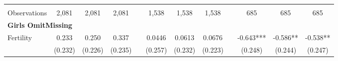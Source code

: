 \begin{landscape}
\begin{table}[htpb!]
\begin{center}
\begin{tabular}{lcccp{2mm}cccp{2mm}ccc}
\begin{footnotesize}\end{footnotesize}&\begin{footnotesize}\end{footnotesize}&\begin{footnotesize}\end{footnotesize}&\begin{footnotesize}\end{footnotesize}&\begin{footnotesize}\end{footnotesize}&\begin{footnotesize}\end{footnotesize}&\begin{footnotesize}\end{footnotesize}&\begin{footnotesize}\end{footnotesize}&\begin{footnotesize}\end{footnotesize}&\begin{footnotesize}\end{footnotesize}&\begin{footnotesize}\end{footnotesize}&\begin{footnotesize}\end{footnotesize}\\Observations&2,081&2,081&2,081&&1,538&1,538&1,538&&685&685&685\\
\multicolumn{12}{l}{\textbf{Girls OmitMissing}}\\ 
Fertility&0.233&0.250&0.337&&0.0446&0.0613&0.0676&&-0.643***&-0.586**&-0.538**\\
&(0.232)&(0.226)&(0.235)&&(0.257)&(0.232)&(0.223)&&(0.248)&(0.244)&(0.247)\\

\end{tabular}
\end{center}
\end{table}
\end{landscape}
